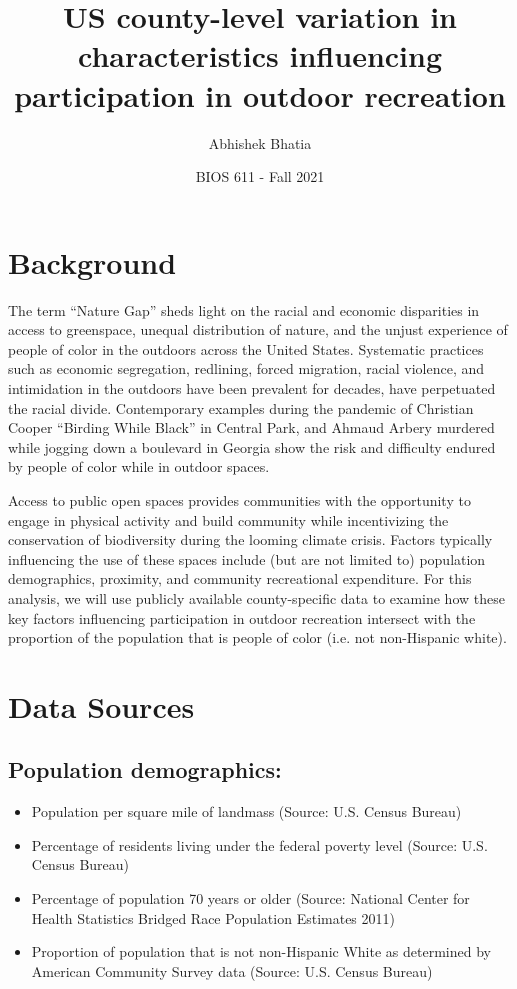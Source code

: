 \documentclass{article}
\begin{document}
\title{US county-level variation in characteristics influencing participation in outdoor recreation}
\author{Abhishek Bhatia}
\date{BIOS 611 - Fall 2021}
\maketitle


\section{Background}


The term ``Nature Gap'' sheds light on the racial and economic disparities in access to greenspace, unequal distribution of nature, and the unjust experience of people of color in the outdoors across the United States. Systematic practices such as economic segregation, redlining, forced migration, racial violence, and intimidation in the outdoors have been prevalent for decades, have perpetuated the racial divide. Contemporary examples during the pandemic of Christian Cooper ``Birding While Black'' in Central Park, and Ahmaud Arbery murdered while jogging down a boulevard in Georgia show the risk and difficulty endured by people of color while in outdoor spaces.

Access to public open spaces provides communities with the opportunity to engage in physical activity and build community while incentivizing the conservation of biodiversity during the looming climate crisis. Factors typically influencing the use of these spaces include (but are not limited to) population demographics, proximity, and community recreational expenditure. For this analysis, we will use publicly available county-specific data to examine how these key factors influencing participation in outdoor recreation intersect with the proportion of the population that is people of color (i.e. not non-Hispanic white).

\section{\textbf{Data Sources}}
\subsection{Population demographics:}
\begin{itemize}
\item Population per square mile of landmass (Source: U.S. Census Bureau)
\item Percentage of residents living under the federal poverty level (Source: U.S. Census Bureau)
\item Percentage of population 70 years or older (Source: National Center for Health Statistics Bridged Race Population Estimates 2011)
\item Proportion of population that is not non-Hispanic White as determined by American Community Survey data (Source: U.S. Census Bureau)
\end{itemize}
\end{document}
